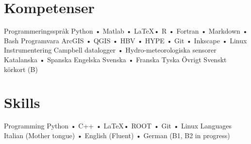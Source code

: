 \ifswedish
  \section{Kompetenser}
    \skill
      {Programmeringsspråk}
      {Python • Matlab • \LaTeX • R • Fortran • Markdown • Bash}
    \skill
      {Programvara}
      {ArcGIS • QGIS • HBV • HYPE • Git • Inkscape • Linux}
    \skill
      {Instrumentering}
      {Campbell datalogger • Hydro-meteorologiska sensorer}
    \languages
      {Katalanska • Spanska}
      {Engelska}
      {Svenska • Franska}
      {Tyska}
    \skill
      {Övrigt}
      {Svenskt körkort (B)}
\else
  \section{Skills}
    \skill
      {Programming}
      {Python • C++ • \LaTeX • ROOT • Git • Linux }
    \skill
      {Languages}
      {Italian (Mother tongue) • English (Fluent) • German (B1, B2 in progress)}
   \fi
